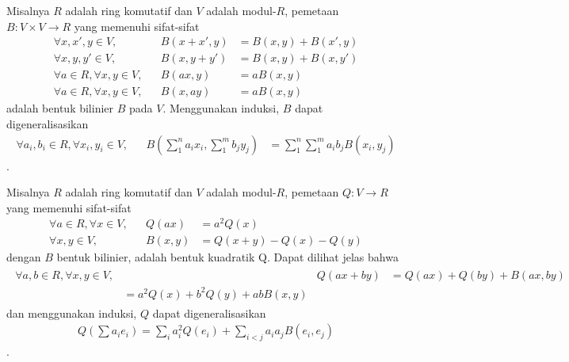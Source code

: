 \begin{defn}
Misalnya $R$ adalah ring komutatif dan $V$ adalah modul-$R$, pemetaan ${B: V \times V \to R}$ yang memenuhi sifat-sifat
\begingroup
\allowdisplaybreaks
\begin{align*}
	\forall x,x',y \in V,&& B(x + x', y) &= B(x, y) + B(x', y) \\
	\forall x,y,y' \in V,&& B(x, y + y') &= B(x, y) + B(x, y') \\
	\forall a \in R, \forall x,y \in V,&& B(ax, y) &= aB(x, y) \\
	\forall a \in R, \forall x,y \in V,&& B(x, ay) &= aB(x, y)
\end{align*}
\endgroup
adalah bentuk bilinier $B$ pada $V$. Menggunakan induksi, $B$ dapat digeneralisasikan
\begin{align*}
	\forall a_i,b_i \in R, \forall x_i,y_i \in V,&& B(\sum_1^n a_i x_i, \sum_1^m b_j y_j) &= \sum_1^n \sum_1^m a_i b_j B(x_i, y_j)
\end{align*}
\citep{Jacobson1995}.
\end{defn}

\begingroup
\allowdisplaybreaks
\begin{defn}
Misalnya $R$ adalah ring komutatif dan $V$ adalah modul-$R$, pemetaan ${Q: V \to R}$ yang memenuhi sifat-sifat
\begin{align*}
	\forall a \in R, \forall x \in V,&& Q(ax) &= a^2Q(x) \\
	\forall x,y \in V,&& B(x, y) &= Q(x + y) - Q(x) - Q(y)
\end{align*}
dengan $B$ bentuk bilinier, adalah bentuk kuadratik Q. Dapat dilihat jelas bahwa
\begin{align*}
	\begin{split}
		\forall a,b \in R, \forall x,y \in V,&&
		Q(ax + by) &= Q(ax) + Q(by) + B(ax,by) \\
		&= a^2 Q(x) + b^2 Q(y) + abB(x,y)
	\end{split}
\end{align*}
dan menggunakan induksi, $Q$ dapat digeneralisasikan
\begin{align*}
	Q(\sum a_i e_i) = \sum_i a_i^2 Q(e_i) + \sum_{i < j} a_i a_j B(e_i,e_j)
\end{align*}
\citep{Jacobson1995}.
\end{defn}
\endgroup

